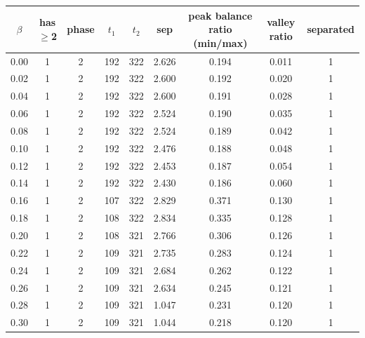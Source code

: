 \begin{tabular}{ccccccccc}
\toprule
$\beta$ & has$\geq$2 & phase & $t_1$ & $t_2$ & sep & peak balance ratio (min/max) & valley ratio & separated \\
\midrule
0.00 & 1 & 2 & 192 & 322 & 2.626 & 0.194 & 0.011 & 1 \\
0.02 & 1 & 2 & 192 & 322 & 2.600 & 0.192 & 0.020 & 1 \\
0.04 & 1 & 2 & 192 & 322 & 2.600 & 0.191 & 0.028 & 1 \\
0.06 & 1 & 2 & 192 & 322 & 2.524 & 0.190 & 0.035 & 1 \\
0.08 & 1 & 2 & 192 & 322 & 2.524 & 0.189 & 0.042 & 1 \\
0.10 & 1 & 2 & 192 & 322 & 2.476 & 0.188 & 0.048 & 1 \\
0.12 & 1 & 2 & 192 & 322 & 2.453 & 0.187 & 0.054 & 1 \\
0.14 & 1 & 2 & 192 & 322 & 2.430 & 0.186 & 0.060 & 1 \\
0.16 & 1 & 2 & 107 & 322 & 2.829 & 0.371 & 0.130 & 1 \\
0.18 & 1 & 2 & 108 & 322 & 2.834 & 0.335 & 0.128 & 1 \\
0.20 & 1 & 2 & 108 & 321 & 2.766 & 0.306 & 0.126 & 1 \\
0.22 & 1 & 2 & 109 & 321 & 2.735 & 0.283 & 0.124 & 1 \\
0.24 & 1 & 2 & 109 & 321 & 2.684 & 0.262 & 0.122 & 1 \\
0.26 & 1 & 2 & 109 & 321 & 2.634 & 0.245 & 0.121 & 1 \\
0.28 & 1 & 2 & 109 & 321 & 1.047 & 0.231 & 0.120 & 1 \\
0.30 & 1 & 2 & 109 & 321 & 1.044 & 0.218 & 0.120 & 1 \\
\bottomrule
\end{tabular}